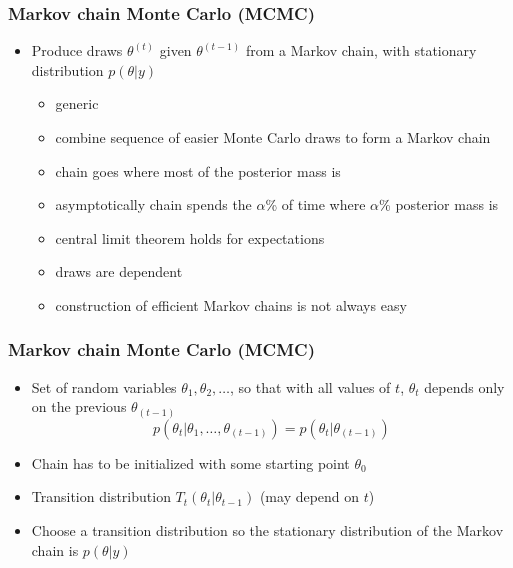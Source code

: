 \documentclass[10pt]{beamer}
\begin{document}
\begin{frame}

\frametitle{Markov chain Monte Carlo (MCMC)}

  \begin{itemize}
  \item Produce draws $\theta^{(t)}$ given $\theta^{(t-1)}$ from a
    Markov chain, with {\color{uured}stationary distribution} $p(\theta|y)$
    \begin{itemize}
    \item<2->[+] generic
    \item<2->[+] combine sequence of easier Monte Carlo draws to form a Markov chain
    \item<3->[+] chain goes where most of the posterior mass is
    \item<3->[+] asymptotically chain spends the $\alpha$\% of time where
      $\alpha$\% posterior mass is
    \item<4->[+] central limit theorem holds for expectations
    \item<5->[-] draws are dependent
    \item<5->[-] construction of efficient Markov chains is not always
      easy
    \end{itemize}
\end{itemize}

\end{frame}

\begin{frame}

\frametitle{Markov chain Monte Carlo (MCMC)}

  \begin{itemize}
  \item Set of random variables $\theta_1,\theta_2,\ldots$, so that
    with all values of $t$, $\theta_t$ depends only on the previous $\theta_{(t-1)}$
    \begin{equation*}
      p(\theta_t|\theta_1,\ldots,\theta_{(t-1)})=p(\theta_t|\theta_{(t-1)})
    \end{equation*}
    \pause
  \item Chain has to be initialized with some starting point $\theta_0$ \pause
  \item Transition distribution $T_t(\theta_t|\theta_{t-1})$ (may
    depend on $t$) \pause
  \item Choose a transition distribution so the
    stationary distribution of the Markov chain is $p(\theta|y)$
  \end{itemize}

\end{frame}
\end{document}

